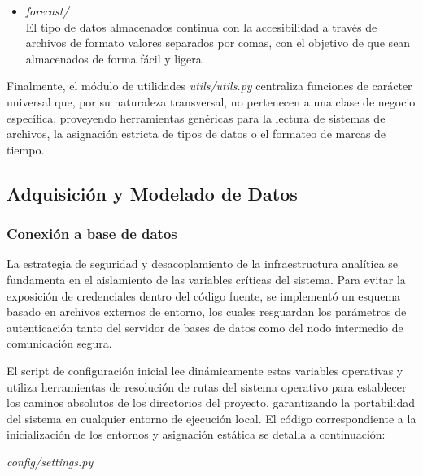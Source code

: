 \documentclass[11pt,a4paper]{report}
\begin{document}
    \begin{itemize}
        \item \textit{forecast/}\\
        El tipo de datos almacenados continua con la accesibilidad a través de archivos de formato valores separados por comas, con el
        objetivo de que sean almacenados de forma fácil y ligera.
    \end{itemize}

    Finalmente, el módulo de utilidades  \textit{utils/utils.py} centraliza funciones de carácter universal que, por su naturaleza transversal,
    no pertenecen a una clase de negocio específica, proveyendo herramientas genéricas para la lectura de sistemas de archivos, la asignación
    estricta de tipos de datos o el formateo de marcas de tiempo.

    \subsection{Adquisición y Modelado de Datos}

        \subsubsection{Conexión a base de datos}
        La estrategia de seguridad y desacoplamiento de la infraestructura analítica se fundamenta en el aislamiento de las variables
        críticas del sistema. Para evitar la exposición de credenciales dentro del código fuente, se implementó un esquema basado en archivos
        externos de entorno, los cuales resguardan los parámetros de autenticación tanto del servidor de bases de datos como del nodo intermedio
        de comunicación segura.

        El script de configuración inicial lee dinámicamente estas variables operativas y utiliza herramientas de resolución de rutas del sistema
        operativo para establecer los caminos absolutos de los directorios del proyecto, garantizando la portabilidad del sistema en cualquier entorno
        de ejecución local. El código correspondiente a la inicialización de los entornos y asignación estática se detalla a continuación:

        \textit{config/settings.py}
\end{document}
